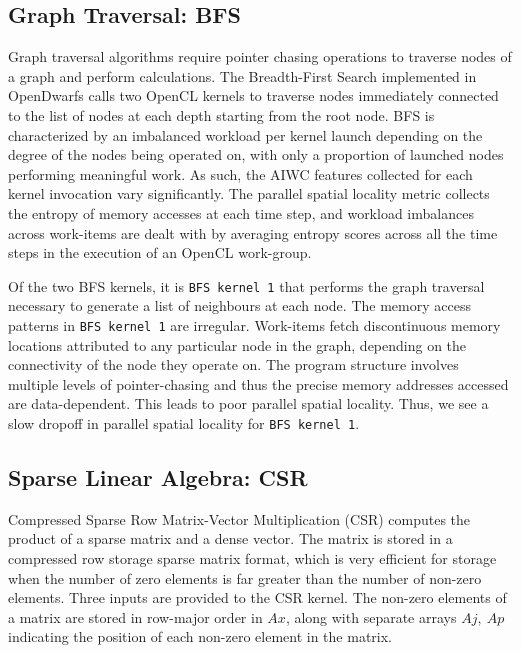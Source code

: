 \documentclass[review=false, sigchi]{acmart}
\begin{document}
	\subsection{Graph Traversal: BFS}
	
	Graph traversal algorithms require pointer chasing operations to traverse nodes of a graph and perform calculations. 
	The Breadth-First Search implemented in OpenDwarfs calls two OpenCL kernels to traverse nodes immediately connected to the list of nodes at each depth starting from the root node. 
	BFS is characterized by an imbalanced workload per kernel launch depending on the degree of the nodes being operated on, with only a proportion of launched nodes performing meaningful work. 
	As such, the AIWC features collected for each kernel invocation vary significantly. 
	The parallel spatial locality metric collects the entropy of memory accesses at each time step, and workload imbalances across work-items are dealt with by averaging entropy scores across all the time steps in the execution of an OpenCL work-group. 
	
	Of the two BFS kernels, it is \texttt{BFS kernel 1} that performs the graph traversal necessary to generate a list of neighbours at each node. The memory access patterns in \texttt{BFS kernel 1} are irregular. 
	Work-items fetch discontinuous memory locations attributed to any particular node in the graph, depending on the connectivity of the node they operate on. 
	The program structure involves multiple levels of pointer-chasing and thus the precise memory addresses accessed are data-dependent. 
	This leads to poor parallel spatial locality. Thus, we see a slow dropoff in parallel spatial locality for \texttt{BFS kernel 1}.
	
	\subsection{Sparse Linear Algebra: CSR}
	
	Compressed Sparse Row Matrix-Vector Multiplication (CSR) computes the product of a sparse matrix and a dense vector.
	The matrix is stored in a compressed row storage sparse matrix format, which is very efficient for storage when the number of zero elements is far greater than the number of non-zero elements. Three inputs are provided to the CSR kernel. The non-zero elements of a matrix are stored in row-major order in $Ax$, along with separate arrays $Aj,\ Ap$ indicating the position of each non-zero element in the matrix.
	
\end{document}
